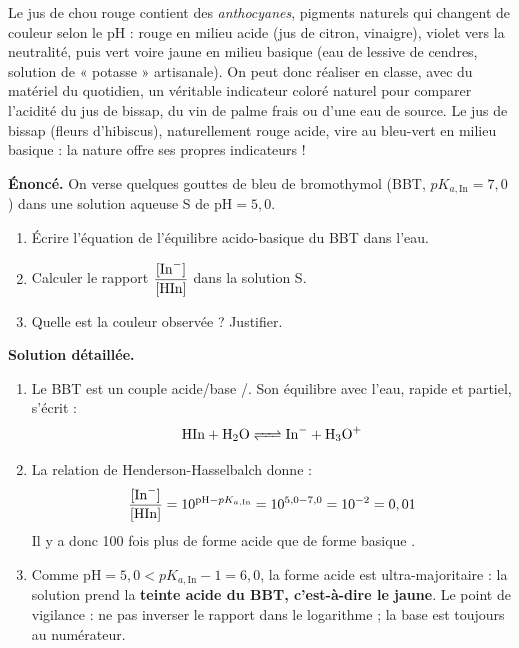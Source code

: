 \documentclass[11pt]{article}
\begin{document}
\begin{savaistu}
Le jus de chou rouge contient des \emph{anthocyanes}, pigments naturels qui changent de couleur selon le pH : rouge en milieu acide (jus de citron, vinaigre), violet vers la neutralité, puis vert voire jaune en milieu basique (eau de lessive de cendres, solution de « potasse » artisanale). On peut donc réaliser en classe, avec du matériel du quotidien, un véritable indicateur coloré naturel pour comparer l'acidité du jus de bissap, du vin de palme frais ou d'une eau de source. Le jus de bissap (fleurs d'hibiscus), naturellement rouge acide, vire au bleu-vert en milieu basique : la nature offre ses propres indicateurs !
\end{savaistu}

\begin{exoresolu}
\textbf{Énoncé.} On verse quelques gouttes de bleu de bromothymol (BBT, $pK_{a,\mathrm{In}} = 7,0$) dans une solution aqueuse S de $\mathrm{pH} = 5,0$.
\begin{enumerate}
\item Écrire l'équation de l'équilibre acido-basique du BBT dans l'eau.
\item Calculer le rapport $\dfrac{[\ce{In-}]}{[\ce{HIn}]}$ dans la solution S.
\item Quelle est la couleur observée ? Justifier.
\end{enumerate}
\tcblower
\textbf{Solution détaillée.}
\begin{enumerate}
\item Le BBT est un couple acide/base /. Son équilibre avec l'eau, rapide et partiel, s'écrit :
\[ \ce{HIn + H2O <=> In- + H3O+} \]
\item La relation de Henderson-Hasselbalch donne :
\[ \frac{[\ce{In-}]}{[\ce{HIn}]} = 10^{\mathrm{pH} - pK_{a,\mathrm{In}}} = 10^{5,0 - 7,0} = 10^{-2} = 0,01 \]
Il y a donc 100 fois plus de forme acide  que de forme basique .
\item Comme $\mathrm{pH} = 5,0 < pK_{a,\mathrm{In}} - 1 = 6,0$, la forme acide est ultra-majoritaire : la solution prend la \textbf{teinte acide du BBT, c'est-à-dire le jaune}. Le point de vigilance : ne pas inverser le rapport dans le logarithme ; la base  est toujours au numérateur.
\end{enumerate}
\end{exoresolu}
\end{document}
